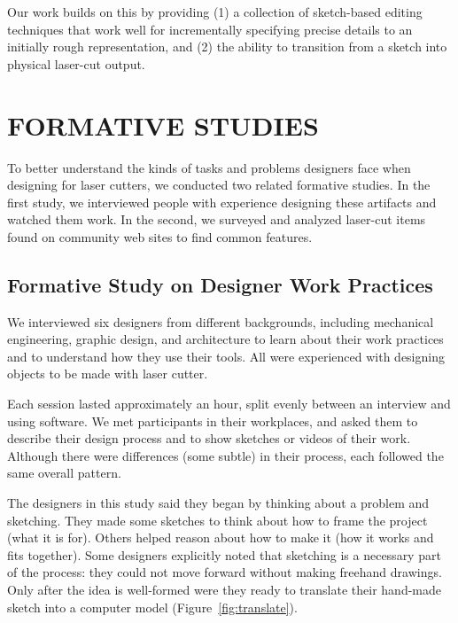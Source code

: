 \documentclass{article}
\begin{document}
Our work builds on this by providing (1) a collection of sketch-based
editing techniques that work well for incrementally specifying precise
details to an initially rough representation, and (2) the ability to
transition from a sketch into physical laser-cut output.

\section{FORMATIVE STUDIES}

To better understand the kinds of tasks and problems designers face
when designing for laser cutters, we conducted two related formative
studies.  In the first study, we interviewed people with experience
designing these artifacts and watched them work. In the second, we
surveyed and analyzed laser-cut items found on community web sites to
find common features.

\subsection{Formative Study on Designer Work Practices}
\label{sec:formative}

We interviewed six designers from different backgrounds, including
mechanical engineering, graphic design, and architecture to learn
about their work practices and to understand how they use their
tools. All were experienced with designing objects to be made with
laser cutter. 

Each session lasted approximately an hour, split evenly between an
interview and using software. We met participants in their workplaces,
and asked them to describe their design process and to show sketches
or videos of their work. Although there were differences (some subtle)
in their process, each followed the same overall pattern.

The designers in this study said they began by thinking about a
problem and sketching. They made some sketches to think about how to
frame the project (what it is for). Others helped reason about how to
make it (how it works and fits together). Some designers explicitly
noted that sketching is a necessary part of the process: they could
not move forward without making freehand drawings. Only after the idea
is well-formed were they ready to translate their hand-made sketch
into a computer model (Figure~\ref{fig:translate}).
\end{document}
